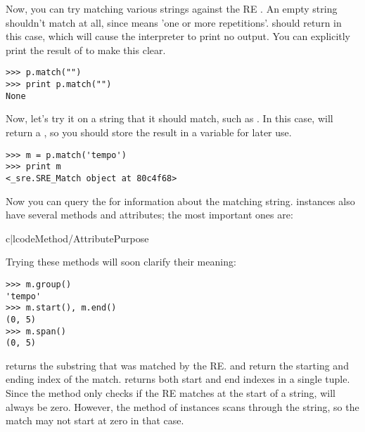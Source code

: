 \documentclass{howto}
\begin{document}
Now, you can try matching various strings against the RE
\regexp{[a-z]+}.  An empty string shouldn't match at all, since
\regexp{+} means 'one or more repetitions'.   should
return  in this case, which will cause the interpreter to
print no output.  You can explicitly print the result of
 to make this clear.

\begin{verbatim}
>>> p.match("")
>>> print p.match("")
None
\end{verbatim}

Now, let's try it on a string that it should match, such as
.  In this case,  will return a
, so you should store the result in a variable for
later use.

\begin{verbatim}
>>> m = p.match('tempo')
>>> print m
<_sre.SRE_Match object at 80c4f68>
\end{verbatim}

Now you can query the  for information about the
matching string.    instances also have several
methods and attributes; the most important ones are:

\begin{tableii}{c|l}{code}{Method/Attribute}{Purpose}
\end{tableii}

Trying these methods will soon clarify their meaning:

\begin{verbatim}
>>> m.group()
'tempo'
>>> m.start(), m.end()
(0, 5)
>>> m.span()
(0, 5)
\end{verbatim}

 returns the substring that was matched by the
RE.   and  return the starting and
ending index of the match.  returns both start and end
indexes in a single tuple.  Since the  method only
checks if the RE matches at the start of a string,
 will always be zero.  However, the 
method of  instances scans through the string, so 
the match may not start at zero in that case.
\end{document}
